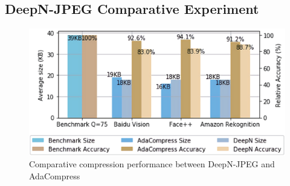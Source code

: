 \subsection{DeepN-JPEG Comparative Experiment}

\begin{figure}[htbp]
    \includegraphics[width=\linewidth]{figures/compare_DeepN.eps}
    \caption{Comparative compression performance between DeepN-JPEG and AdaCompress}
    \label{fig: compare_DeepN}
\end{figure}

